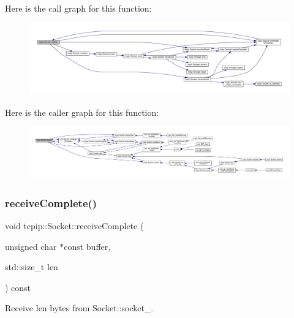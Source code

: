 Here is the call graph for this function\+:\nopagebreak
\begin{figure}[H]
\begin{center}
\leavevmode
\includegraphics[width=350pt]{classtcpip_1_1_socket_a1da162e961fee9f1a1450df9700fd468_cgraph}
\end{center}
\end{figure}
Here is the caller graph for this function\+:\nopagebreak
\begin{figure}[H]
\begin{center}
\leavevmode
\includegraphics[width=350pt]{classtcpip_1_1_socket_a1da162e961fee9f1a1450df9700fd468_icgraph}
\end{center}
\end{figure}
\mbox{\label{classtcpip_1_1_socket_ac752adee7260dc7e7778f639febc0cf1}} 
\subsubsection{\texorpdfstring{receive\+Complete()}{receiveComplete()}}
{\footnotesize\ttfamily void tcpip\+::\+Socket\+::receive\+Complete (\begin{DoxyParamCaption}\item[{unsigned char $\ast$const}]{buffer,  }\item[{std\+::size\+\_\+t}]{len }\end{DoxyParamCaption}) const\hspace{0.3cm}{\ttfamily [protected]}}



Receive {\ttfamily len} bytes from Socket\+::socket\+\_\+. 

